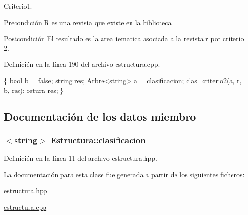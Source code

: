 Criterio1. 

\begin{DoxyPrecond}{Precondición}
R es una revista que existe en la biblioteca 
\end{DoxyPrecond}
\begin{DoxyPostcond}{Postcondición}
El resultado es la area tematica asociada a la revista r por criterio 2. 
\end{DoxyPostcond}


Definición en la línea 190 del archivo estructura.\-cpp.


\begin{DoxyCode}
                                      \{
  \textcolor{keywordtype}{bool} b = \textcolor{keyword}{false};
  \textcolor{keywordtype}{string} res;
  \hyperlink{class_arbre}{Arbre<string>} a = \hyperlink{class_estructura_a2db3e23215e96cbc8faae955dfb6df9f}{clasificacion};
  \hyperlink{class_estructura_a4bf90d197f1dd7f2ba2df555984fa177}{clas\_criterio2}(a, r, b, res);
  \textcolor{keywordflow}{return} res;
\}
\end{DoxyCode}


\subsection{Documentación de los datos miembro}
\hypertarget{class_estructura_a2db3e23215e96cbc8faae955dfb6df9f}{
\subsubsection[{clasificacion}]{$<$string$>$ Estructura\-::clasificacion\hspace{0.3cm}{\ttfamily [private]}}}\label{class_estructura_a2db3e23215e96cbc8faae955dfb6df9f}


Definición en la línea 11 del archivo estructura.\-hpp.



La documentación para esta clase fue generada a partir de los siguientes ficheros\-:\begin{DoxyCompactItemize}
\item 
\hyperlink{estructura_8hpp}{estructura.\-hpp}\item 
\hyperlink{estructura_8cpp}{estructura.\-cpp}\end{DoxyCompactItemize}
